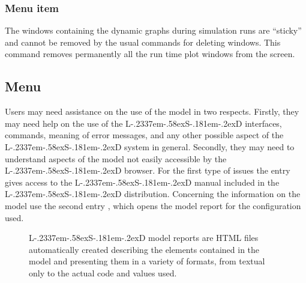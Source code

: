 \documentclass [11pt,a4paper] {book}
\def\LsD{{L\kern-.2337em\lower-.58ex\hbox{S}\kern-.181em\lower-.2ex\hbox{D}}\xspace}
\begin{document}
\subsubsection{Menu item  }

The windows containing the dynamic graphs during simulation runs are ``sticky'' and cannot be removed by the usual commands for deleting windows. This command removes permanently all the run time plot windows from the screen.


\subsection{Menu }

Users may need assistance on the use of the model in two respects. Firstly, they may need help on the use of the \LsD interfaces, commands, meaning of error messages, and any other possible aspect of the \LsD system in general. Secondly, they may need to understand aspects of the model not easily accessible by the \LsD browser. For the first type of issues the entry \menu{\LsD help} gives access to the \LsD manual included in the \LsD distribution. Concerning the information on the model use the second entry , which opens the model report for the configuration used.

\begin{figure}[ht]
  \centering
  \caption{\LsD model reports are HTML files automatically created describing the elements contained in the model and presenting them in a variety of formats, from textual only to the actual code and values used.}
  \label{fig:ex_report}
\end{figure}
\end{document}

